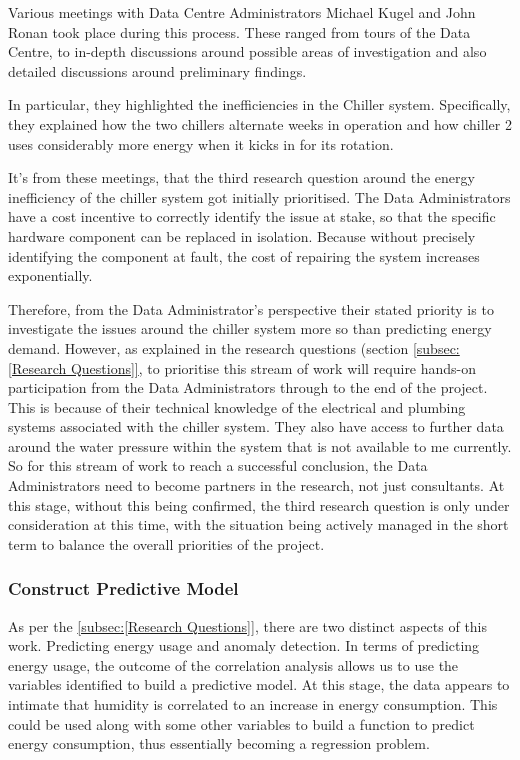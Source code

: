 \documentclass[12pt]{scrartcl}
\begin{document}
Various meetings with Data Centre Administrators Michael Kugel and John Ronan took place during this process. These ranged from tours of the Data Centre, to in-depth discussions around possible areas of investigation and also detailed discussions around preliminary findings. 

In particular, they highlighted the inefficiencies in the Chiller system. Specifically, they explained how the two chillers alternate weeks in operation and how chiller 2 uses considerably more energy when it kicks in for its rotation.

It's from these meetings, that the third research question around the energy inefficiency of the chiller system got initially prioritised. The Data Administrators have a cost incentive to correctly identify the issue at stake, so that the specific hardware component can be replaced in isolation. Because without precisely identifying the component at fault, the cost of repairing the system increases exponentially. 

Therefore, from the Data Administrator's perspective their stated priority is to investigate the issues around the chiller system more so than predicting energy demand. However, as explained in the research questions (section \ref{subsec:[Research Questions]}, to prioritise this stream of work will require hands-on participation from the Data Administrators through to the end of the project. This is because of their technical knowledge of the electrical and plumbing systems associated with the chiller system. They also have access to further data around the water pressure within the system that is not available to me currently. So for this stream of work to reach a successful conclusion, the Data Administrators need to become partners in the research, not just consultants. At this stage, without this being confirmed, the third research question is only under consideration at this time, with the situation being actively managed in the short term to balance the overall priorities of the project.  


\subsubsection{Construct Predictive Model}
\label{subsubsec:[Construct Predictive Model]}

As per the \ref{subsec:[Research Questions]}, there are two distinct aspects of this work. Predicting energy usage and anomaly detection. In terms of predicting energy usage, the outcome of the correlation analysis allows us to use the variables identified to build a predictive model. At this stage, the data appears to intimate that humidity is correlated to an increase in energy consumption. This could be used along with some other variables to build a function to predict energy consumption, thus essentially becoming a regression problem. 
\end{document}
